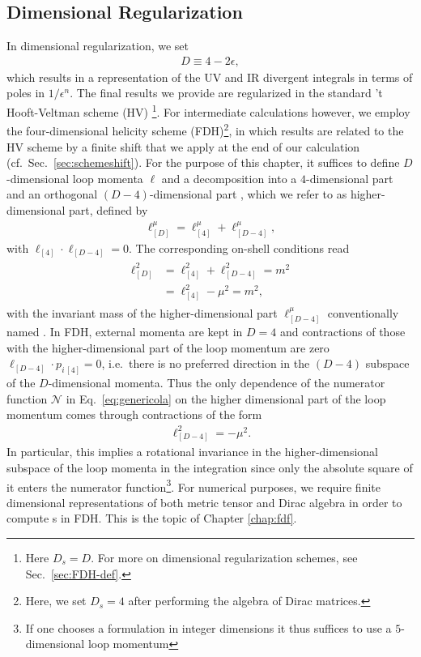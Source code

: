\subsection{Dimensional Regularization}
\label{sec:dimregfdh}
In dimensional regularization, we set
\begin{align}
  D\equiv 4-2\epsilon,
\end{align}
which results in a representation of the UV and IR divergent integrals
in terms of poles in $1/\epsilon^n$. The final results we
provide are regularized in the standard 't
Hooft-Veltman scheme (HV) \cite{tHooft:1972tcz}\footnote{Here $D_s=D$. For more on dimensional regularization schemes, see Sec.~\ref{sec:FDH-def}.}. For intermediate calculations however, we employ the four-dimensional
helicity scheme (FDH)\footnote{Here, we set $D_s=4$ after performing
  the algebra of Dirac matrices.}, in which results are related to the HV scheme by a finite shift
that we apply at the end of our calculation
(cf.~Sec.~\ref{sec:schemeshift}). For the purpose of this chapter, it
suffices to define $D$-dimensional loop momenta $\ell$ and a
decomposition into a
$4$-dimensional part and an orthogonal $(D-4)$-dimensional part
\cite{Bern:1995db}, which we refer to as higher-dimensional part,
defined by
\begin{align}\label{eq:lsplit}
  \ell^\mu_{[D]}=\ell_{[4]}^\mu + \ell_{[D-4]}^\mu,
\end{align}
with $\ell_{[4]}\cdot \ell_{[D-4]} = 0$. The corresponding on-shell conditions read
\begin{align}\label{eq:ddimos}
\begin{split}
  \ell^2_{[D]}&=\ell_{[4]}^2+\ell^2_{[D-4]}=m^2\\
&=\ell_{[4]}^2-\mu^2=m^2,
\end{split}
\end{align}
with the invariant mass of the higher-dimensional part
$\ell_{[D-4]}^\mu$ conventionally
named . In FDH, external momenta are kept in $D=4$ and contractions of those with
the higher-dimensional part of the loop momentum are zero
$\ell_{[D-4]}\cdot p_{i\,[4]} = 0$, i.e.\ there is no preferred direction in the
$(D-4)$ subspace of the $D$-dimensional momenta. Thus the only dependence of the numerator
function $\mathcal{N}$ in Eq.~\eqref{eq:genericola} on the higher
dimensional part of the loop momentum comes through contractions of
the form
\begin{align}
  \ell^2_{[D-4]}=-\mu^2.
\end{align}
In particular, this
implies a rotational invariance in the higher-dimensional subspace of
the loop momenta in the integration since only the absolute square of it enters the
numerator function\footnote{If one chooses a formulation in integer
  dimensions it thus suffices to use a $5$-dimensional loop
  momentum}. For numerical purposes, we require finite dimensional representations of both metric tensor and Dirac
algebra in order to compute \ola s in FDH. This is the topic of Chapter \ref{chap:fdf}.



